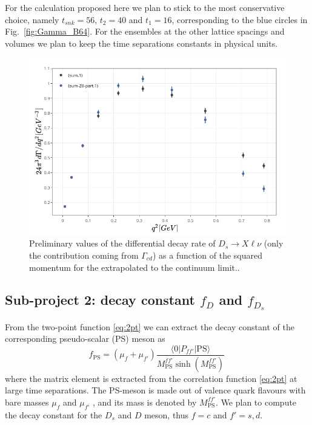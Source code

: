 For the calculation proposed here we plan to stick to the most
conservative choice, namely $t_{snk}=56$, $t_2=40$ and $t_1=16$,
corresponding to the blue circles in Fig.~\ref{fig:Gamma_B64}.
For the ensembles at the other lattice spacings and volumes we plan to keep the
time separations constants in physical units. 


\begin{figure}
  \centering
  \includegraphics[scale=0.7]{plots/dgamma_dq2.png}
  \caption{Preliminary values of the differential decay rate of
    $D_s\to X\ell\nu$ (only the contribution coming from $\Gamma_{cd}$) as a function of the squared momentum for the
    extrapolated to the continuum limit..}
  \label{fig:dGammadq_Ds}
\end{figure}

\subsection{Sub-project 2: decay constant $f_D$ and $f_{D_s}$}

From the two-point function \eqref{eq:2pt} we can extract the decay
constant of the corresponding pseudo-scalar (PS) meson as 
\begin{equation}
  f_\mathrm{PS}=(\mu_f+\mu_{f'})\frac{\langle 0| P_{ff'}|
    \mathrm{PS}\rangle}{M_\mathrm{PS}^{ff'}\sinh(M_\mathrm{PS}^{ff'})}\, 
\end{equation}
where the matrix element is extracted from the correlation function
\eqref{eq:2pt} at large time separations. The PS-meson is made out of
valence quark flavours with bare masses $\mu_f$ and $\mu_{f'}$ , and
its mass is denoted by $M_\mathrm{PS}^{ff'}$. We plan to compute the
decay constant for the $D_s$ and $D$ meson, thus $f=c$ and $f'=s,d$. 

\endinput
